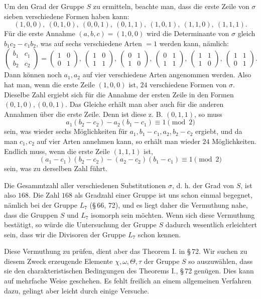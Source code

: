 \documentclass[11pt]{article}
\providecommand{\mat}[4]{\begin{pmatrix}#1&#2\\#3&#4\end{pmatrix}}
\providecommand{\mat}[4]{\begin{pmatrix}#1&#2\\#3&#4\end{pmatrix}}
\providecommand{\mat}[1]{\begin{pmatrix}#1\end{pmatrix}}
\begin{document}
Um den Grad der Gruppe $S$ zu ermitteln, beachte man, dass die erste Zeile von $\sigma$ sieben verschiedene Formen haben kann:
\[
 (1,0,0),\ (0,1,0),\ (0,0,1),\ (0,1,1),\ (1,0,1),\ (1,1,0),\ (1,1,1).
\]
Für die erste Annahme $(a,b,c)=(1,0,0)$ wird die Determinante von $\sigma$ gleich $b_1c_2-c_1b_2$, was auf sechs verschiedene Arten $=1$ werden kann, nämlich:
\[
 \mat{b_1}{c_1}{b_2}{c_2}=\mat{1}{0}{0}{1},\ \mat{1}{0}{1}{1},\ \mat{0}{1}{1}{0},\ \mat{0}{1}{1}{1},\ \mat{1}{1}{1}{0},\ \mat{1}{1}{0}{1}.
\]
Dann können noch $a_1,a_2$ auf vier verschiedene Arten angenommen werden. Also hat man, wenn die erste Zeile $(1,0,0)$ ist, $24$ verschiedene Formen von $\sigma$. Dieselbe Zahl ergiebt sich für die Annahme der ersten Zeile in den Formen $(0,1,0),(0,0,1)$. Das Gleiche erhält man aber auch für die anderen Annahmen über die erste Zeile. Denn ist diese z. B. $(0,1,1)$, so muss
\[
 a_1(b_2-c_2)-a_2(b_1-c_1)\equiv 1\pmod 2
\]
sein, was wieder sechs Möglichkeiten für $a_1,b_1-c_1,a_2,b_2-c_2$ ergiebt, und da man $c_1,c_2$ auf vier Arten annehmen kann, so erhält man wieder $24$ Möglichkeiten. Endlich muss, wenn die erste Zeile $(1,1,1)$ ist,
\[
 (a_1-c_1)(b_2-c_2)-(a_2-c_2)(b_1-c_1)\equiv 1\pmod 2
\]
sein, was zu derselben Zahl führt.

Die Gesammtzahl aller verschiedenen Substitutionen $\sigma$, d. h. der Grad von $S$, ist also $168$. Die Zahl $168$ als Gradzahl einer Gruppe ist uns schon einmal begegnet, nämlich bei der Gruppe $L_7$ (\S\,66, 72), und es liegt daher die Vermuthung nahe, dass die Gruppen $S$ und $L_7$ isomorph sein möchten. Wenn sich diese Vermuthung bestätigt, so würde die Untersuchung der Gruppe $S$ dadurch wesentlich erleichtert sein, dass wir die Divisoren der Gruppe $L_7$ schon kennen.

Diese Vermuthung zu prüfen, dient aber das Theorem I. in \S\,72. Wir suchen zu diesem Zweck erzeugende Elemente $\chi,\omega,\Theta,\tau$ der Gruppe $S$ so auszuwählen, dass sie den charakteristischen Bedingungen des Theorems I., \S\,72 genügen. Dies kann auf mehrfache Weise geschehen. Es fehlt freilich an einem allgemeinen Verfahren dazu, gelingt aber leicht durch einige Versuche.
\end{document}
